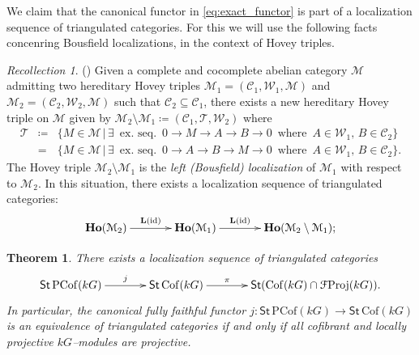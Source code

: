 \documentclass{amsart}
\def \C{{\mathcal C}}
\def \T{{\mathcal T}}
\def \W{{\mathcal W}}
\numberwithin{equation}{section}%
\newtheorem{theorem}[equation]{Theorem}
\theoremstyle{remark}
\newtheorem{recollection}[equation]{Recollection}
\begin{document}
{We claim that the canonical functor in \eqref{eq:exact_functor} is part of a localization sequence of triangulated categories. For this we will use the following facts concenring Bousfield localizations, in the context of Hovey triples.

\begin{recollection}\textnormal{(\cite[Proposition~1.4.6]{Bec14})}
\label{recoll:Bousfield}
Given a complete and cocomplete abelian category $\mathcal{M}$ admitting two hereditary Hovey triples
$\mathcal{M}_1=(\C_1,\W_1,\mathcal{M})$ and $\mathcal{M}_2=(\C_2,\W_2,\mathcal{M})$ such that $\C_2\subseteq \C_1$, there exists a new hereditary Hovey triple on $\mathcal{M}$ given by 
$\mathcal{M}_2\setminus \mathcal{M}_1\coloneqq(\C_1,\mathcal{T},\W_2)$ where 
\begin{eqnarray}
\T & \coloneqq & \{M\in\mathcal{M}\, |\, \exists\,\,\, \mbox{ex. seq.}\,\,\,  0\rightarrow M\rightarrow A\rightarrow B\rightarrow 0\,\,\, \mbox{where}\,\,\,  A\in\W_1,\,  B\in\C_2\} \nonumber \\
 & = &  \{M\in\mathcal{M}\, |\, \exists\,\,\, \mbox{ex. seq.}\,\,\,  0\rightarrow A\rightarrow B\rightarrow M\rightarrow 0\,\,\, \mbox{where}\,\,\,  A\in\W_1,\,  B\in\C_2\}. \nonumber
\end{eqnarray}
The Hovey triple $\mathcal{M}_2\setminus \mathcal{M}_1$ is the \textit{left (Bousfield) localization} of $\mathcal{M}_1$ with respect to $\mathcal{M}_2$. In this situation, there exists a localization sequence of triangulated categories:
\begin{equation}
\label{eq:Becker_loc}
\xymatrix@C=3pc{
\mathbf{Ho}(\mathcal{M}_2) \ar[r]^-{\mathbf{L}(\mathrm{id})} & \mathbf{Ho}(\mathcal{M}_1) \ar[r]^-{\mathbf{L}(\mathrm{id})} & \mathbf{Ho}(\mathcal{M}_2\setminus \mathcal{M}_1); 
}
\end{equation}
\end{recollection}



\begin{theorem}
\label{thm:comparison}
There exists a localization sequence of triangulated categories
\begin{equation}
\label{eq:loc_seq}
\xymatrix@C=3pc{
\mathsf{St}\,\mathrm{PCof}(kG)  \ar[r]^-{j} & \mathsf{St}\,\mathrm{Cof}(kG) \ar[r]^-{\pi} & \mathsf{St}({\mathrm{Cof}(kG)\cap\mathcal{F}\mathrm{Proj}}(kG)). 
}
\end{equation}
In particular, the canonical fully faithful functor $j\colon \mathsf{St}\,\mathrm{PCof}(kG)\rightarrow \mathsf{St}\,\mathrm{Cof}(kG)$  is an equivalence of triangulated categories if and only if all cofibrant and locally projective $kG$--modules are projective.
\end{theorem}

}
\end{document}
